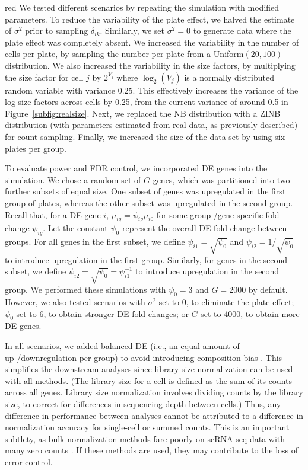 \documentclass{article}
\begin{document}
\begin{color}{red}
We tested different scenarios by repeating the simulation with modified parameters.
To reduce the variability of the plate effect, we halved the estimate of $\sigma^2$ prior to sampling $\delta_{ik}$.
Similarly, we set $\sigma^2=0$ to generate data where the plate effect was completely absent.
We increased the variability in the number of cells per plate, by sampling the number per plate from a Uniform$(20, 100)$ distribution.
We also increased the variability in the size factors, by multiplying the size factor for cell $j$ by $2^{V_j}$ where $\log_2(V_j)$ is a normally distributed random variable with variance 0.25.
This effectively increases the variance of the log-size factors across cells by 0.25, from the current variance of around 0.5 in Figure~\ref{subfig:realsize}.
Next, we replaced the NB distribution with a ZINB distribution (with parameters estimated from real data, as previously described) for count sampling.
Finally, we increased the size of the data set by using six plates per group.

To evaluate power and FDR control, we incorporated DE genes into the simulation.
We chose a random set of $G$ genes, which was partitioned into two further subsets of equal size.
One subset of genes was upregulated in the first group of plates, whereas the other subset was upregulated in the second group.
Recall that, for a DE gene $i$, $\mu_{ig} = \psi_{ig}\mu_{i0}$ for some group-/gene-specific fold change $\psi_{ig}$.
Let the constant $\psi_0$ represent the overall DE fold change between groups.
For all genes in the first subset, we define $\psi_{i1} = \sqrt{\psi_0}$ and $\psi_{i2} = 1/\sqrt{\psi_0}$ to introduce upregulation in the first group.
Similarly, for genes in the second subset, we define $\psi_{i2} = \sqrt{\psi_0} = \psi_{i1}^{-1}$ to introduce upregulation in the second group.
We performed these simulations with $\psi_0=3$ and $G=2000$ by default.
However, we also tested scenarios with $\sigma^2$ set to 0, to eliminate the plate effect; $\psi_0$ set to 6, to obtain stronger DE fold changes; or $G$ set to 4000, to obtain more DE genes.

In all scenarios, we added balanced DE (i.e., an equal amount of up-/downregulation per group) to avoid introducing composition bias \citep{robinson2010scaling}.
This simplifies the downstream analyses since library size normalization can be used with all methods.
(The library size for a cell is defined as the sum of its counts across all genes.
Library size normalization involves dividing counts by the library size, to correct for differences in sequencing depth between cells.)
Thus, any difference in performance between analyses cannot be attributed to a difference in normalization accuracy for single-cell or summed counts.
This is an important subtlety, as bulk normalization methods fare poorly on scRNA-seq data with many zero counts \citep{lun2016pooling}.
If these methods are used, they may contribute to the loss of error control.
\end{color}
\end{document}
